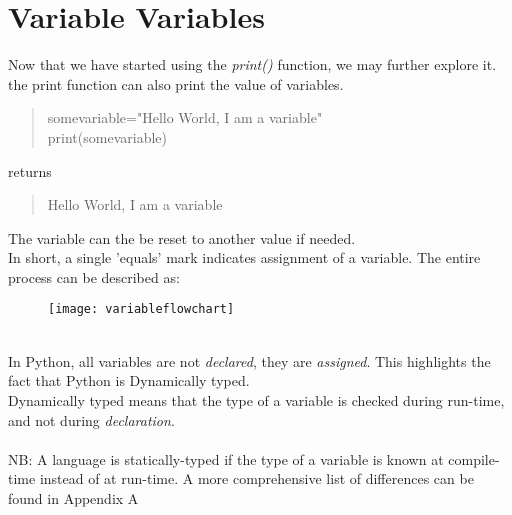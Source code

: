 \section{Variable Variables}
Now that we have started using the \emph{print()} function, we may further explore it.\\
the print function can also print the value of variables.
\begin{quote}
somevariable="Hello World, I am a variable"\\
print(somevariable)
\end{quote}
returns
\begin{quote}
Hello World, I am a variable
\end{quote}
The variable can the be reset to another value if needed.\\ In short, a single 'equals' mark indicates assignment of a variable.
The entire process can be described as: 
\begin{figure}[h]
\texttt{[image: variableflowchart]}
\end{figure}
\\
In Python, all variables are not \emph{declared}, they are \emph{assigned}. This highlights the fact that Python is Dynamically typed.\\ Dynamically typed means that the type of a variable is checked during run-time, and not during \emph{declaration}. \\ \\ 
NB: A language is statically-typed if the type of a variable is known at compile-time instead of at run-time. A more comprehensive list of differences can be found in Appendix A
